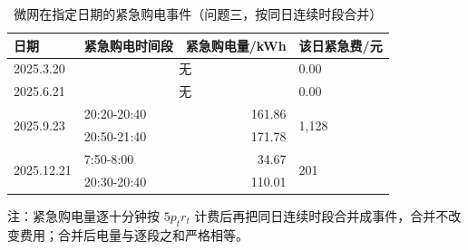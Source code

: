 \begin{table}[htbp]
  \centering
  \caption{微网在指定日期的紧急购电事件（问题三，按同日连续时段合并）}
  \label{tab:p3-emg}
  \footnotesize
  \begin{tabular}{llrl}
    \toprule
    日期 & 紧急购电时间段 & 紧急购电量/kWh & 该日紧急费/元 \\
    \midrule
    2025.3.20 & \multicolumn{2}{c}{无} & 0.00 \\
    \midrule
    2025.6.21 & \multicolumn{2}{c}{无} & 0.00 \\
    \midrule
    \multirow{2}{*}{2025.9.23} & 20{:}20-20{:}40 & 161.86 & \multirow{2}{*}{1,128} \\
     & 20{:}50-21{:}40 & 171.78 & \\
    \midrule
    \multirow{2}{*}{2025.12.21} & 7{:}50-8{:}00 & 34.67 & \multirow{2}{*}{201} \\
     & 20{:}30-20{:}40 & 110.01 & \\
    \bottomrule
  \end{tabular}
  \par\vspace{2pt}
  \begin{minipage}{.92\textwidth}\footnotesize
    注：紧急购电量逐十分钟按 $5p_tr_t$ 计费后再把同日连续时段合并成事件，合并不改变费用；合并后电量与逐段之和严格相等。
  \end{minipage}
\end{table}
